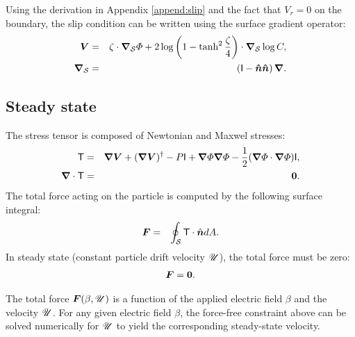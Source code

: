 Using the derivation in Appendix \ref{append:slip} and the fact that $V_r = 0$ 
on the boundary, the slip condition can be written using the surface
gradient operator:
\begin{eqnarray}
\boldsymbol{V} &=& 
\zeta \cdot \boldsymbol{\nabla}_\mathcal{S} \varPhi 
+ 2\log\left(1-\tanh^2\frac{\zeta}{4}\right) \cdot \boldsymbol{\nabla}_\mathcal{S} \log C, \\
\boldsymbol{\nabla}_\mathcal{S} &=& \left(\mathsf{I} - \boldsymbol{\hat{n}}\boldsymbol{\hat{n}}\right) \boldsymbol{\nabla}.
\end{eqnarray}

\subsection{Steady state}
The stress tensor is composed of Newtonian and Maxwel stresses:
\begin{eqnarray}
\mathsf{T} &=& \boldsymbol{\nabla} \boldsymbol{V} + (\boldsymbol{\nabla} \boldsymbol{V})^\dagger - P \mathsf{I}
+ \boldsymbol{\nabla} \varPhi \boldsymbol{\nabla} \varPhi - \frac{1}{2} (\boldsymbol{\nabla} \varPhi \cdot \boldsymbol{\nabla} \varPhi) \mathsf{I}, \\
\boldsymbol{\nabla} \cdot \mathsf{T} &=& \boldsymbol{0}.
\end{eqnarray}
The total force acting on the particle is computed by the following surface integral:
\begin{eqnarray}
\boldsymbol{F} &=& \oint_\mathcal{S} \mathsf{T} \cdot \hat{\boldsymbol{n}} dA.
\end{eqnarray}
In steady state (constant particle drift velocity $\mathscr{U}$), 
the total force must be zero: 
\begin{eqnarray}
\boldsymbol{F} = \boldsymbol{0}.
\end{eqnarray}

The total force $\boldsymbol{F}(\beta, \mathscr{U})$ is a function of the applied electric field $\beta$ and
the velocity $\mathscr{U}$.
For any given electric field $\beta$, the force-free constraint above 
can be solved numerically for $\mathscr{U}$ to
yield the corresponding steady-state velocity.
